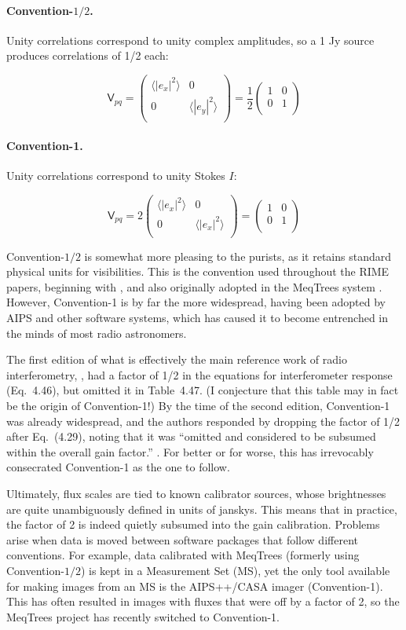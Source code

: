 \documentclass{aa}
\newcommand{\matrixtt}[4]{\left( \begin{array}{cc}#1&#2\\#3&#4\\\end{array} \right)}
\newcommand{\coh}[2]{\mathsf{{#1}}_{{#2}}}
\begin{document}
\paragraph{Convention-$\scriptstyle 1/2$.} Unity correlations correspond to unity complex amplitudes, so a 1 Jy source produces correlations of 1/2 each: 

\[
\coh{V}{pq} = \matrixtt{\langle |e_x|^2\rangle }{0}{0}{\langle |e_y|^2\rangle } = \frac{1}{2}\matrixtt{1}{0}{0}{1}
\]

\paragraph{Convention-1.} Unity correlations correspond to unity Stokes $I$:

\[
\coh{V}{pq} = 2\matrixtt{\langle |e_x|^2\rangle }{0}{0}{\langle |e_x|^2\rangle } = \matrixtt{1}{0}{0}{1}
\]

Convention-$\scriptstyle 1/2$ is somewhat more pleasing to the purists, as it retains standard physical units for visibilities. This is the convention used throughout the RIME papers, beginning with \citet{ME1}, and also originally adopted in the MeqTrees system \citep{meqtrees}. However, Convention-1 is by far the more widespread, having been adopted by AIPS and other software systems, which has caused it to become entrenched in the minds of most radio astronomers.

The first edition of what is effectively the main reference work of radio interferometry, \citet*{tms1}, had a factor of 1/2 in the equations for interferometer response (Eq.~4.46), but omitted it in Table~4.47. (I conjecture that this table may in fact be the origin of Convention-1!) By the time of the second edition, Convention-1 was already widespread, and the authors responded by dropping the factor of 1/2 after Eq.~(4.29), noting that it was ``omitted and considered to be subsumed within the overall gain factor.'' \citep[see p. 102]{tms}. For better or for worse, this has irrevocably consecrated Convention-1 as the one to follow.

Ultimately, flux scales are tied to known calibrator sources, whose brightnesses are quite unambiguously defined in units of janskys. This means that in practice, the factor of 2 is indeed quietly subsumed into the gain calibration. Problems arise when data is moved between software packages that follow different conventions. For example, data calibrated with MeqTrees (formerly using  Convention-$\scriptstyle 1/2$) is kept in a Measurement Set (MS), yet the only tool available for making images from an MS is the AIPS++/CASA imager (Convention-1). This has often resulted in images with fluxes that were off by a factor of 2, so the MeqTrees project has recently switched to Convention-1.
\end{document}
